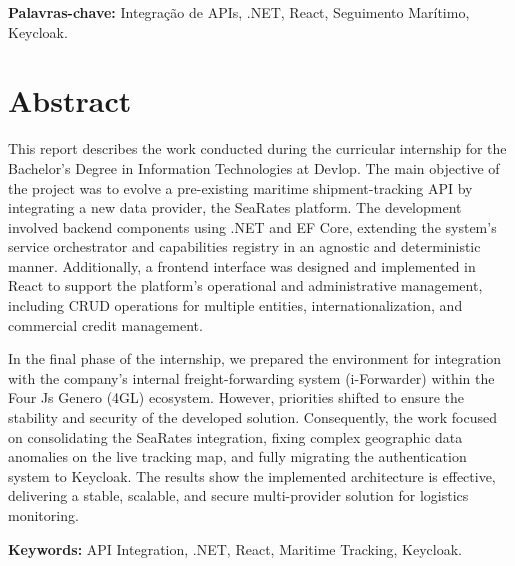 \documentclass[a4paper,12pt]{report}
\begin{document}
\vspace{1cm}
\noindent\textbf{Palavras-chave:} Integração de APIs, .NET, React, Seguimento Marítimo, Keycloak.

\newpage

\chapter*{Abstract}

This report describes the work conducted during the curricular internship for the Bachelor's Degree in Information Technologies at Devlop. The main objective of the project was to evolve a pre-existing maritime shipment-tracking API by integrating a new data provider, the SeaRates platform. The development involved backend components using .NET and EF Core, extending the system's service orchestrator and capabilities registry in an agnostic and deterministic manner. Additionally, a frontend interface was designed and implemented in React to support the platform's operational and administrative management, including CRUD operations for multiple entities, internationalization, and commercial credit management.

In the final phase of the internship, we prepared the environment for integration with the company's internal freight-forwarding system (i-Forwarder) within the Four Js Genero (4GL) ecosystem. However, priorities shifted to ensure the stability and security of the developed solution. Consequently, the work focused on consolidating the SeaRates integration, fixing complex geographic data anomalies on the live tracking map, and fully migrating the authentication system to Keycloak. The results show the implemented architecture is effective, delivering a stable, scalable, and secure multi-provider solution for logistics monitoring.

\vspace{1cm}
\noindent\textbf{Keywords:} API Integration, .NET, React, Maritime Tracking, Keycloak.

\newpage

\tableofcontents
\newpage

\listoffigures
{}
\newpage

\listoftables
{}
\end{document}
